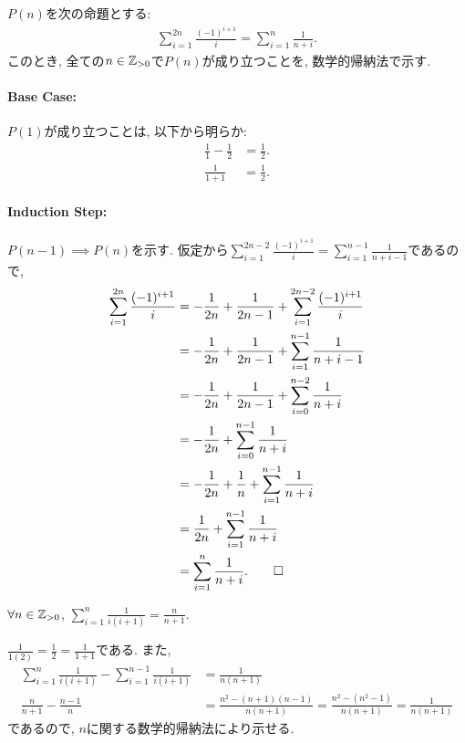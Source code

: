 \begin{proof*}
  $P(n)$を次の命題とする:
  \begin{align*}
    \sum_{i=1}^{2n}\frac{(-1)^{i+1}}{i}=\sum_{i=1}^n\frac{1}{n+i}.
  \end{align*}
  このとき,
  全ての$n\in\mathbb{Z}_{>0}$で$P(n)$が成り立つことを,
  数学的帰納法で示す.

  \paragraph{Base Case:}
  $P(1)$が成り立つことは, 以下から明らか:
  \begin{align*}
    \frac{1}{1}-\frac{1}{2}&=\frac{1}{2}.\\
    \frac{1}{1+1}&=\frac{1}{2}.
  \end{align*}

  \paragraph{Induction Step:}
  $P(n-1)\implies P(n)$を示す.
  仮定から$\sum_{i=1}^{2n-2}\frac{(-1)^{i+1}}{i}=\sum_{i=1}^{n-1}\frac{1}{n+i-1}$であるので,
  \begin{align*}
    \sum_{i=1}^{2n}\frac{(-1)^{i+1}}{i}
    &=-\frac{1}{2n}+\frac{1}{2n-1}+\sum_{i=1}^{2n-2}\frac{(-1)^{i+1}}{i}\\
    &=-\frac{1}{2n}+\frac{1}{2n-1}+\sum_{i=1}^{n-1}\frac{1}{n+i-1}\\
    &=-\frac{1}{2n}+\frac{1}{2n-1}+\sum_{i=0}^{n-2}\frac{1}{n+i}\\
    &=-\frac{1}{2n}+\sum_{i=0}^{n-1}\frac{1}{n+i}\\
    &=-\frac{1}{2n}+\frac{1}{n}+\sum_{i=1}^{n-1}\frac{1}{n+i}\\
    &=\frac{1}{2n}+\sum_{i=1}^{n-1}\frac{1}{n+i}\\
    &=\sum_{i=1}^{n}\frac{1}{n+i}
    .\qedhere
  \end{align*}
\end{proof*}

\begin{prop}
  \label{p:20230727}
  $\forall n \in \mathbb{Z}_{>0}$,
  $\sum_{i=1}^n\frac{1}{i(i+1)}=\frac{n}{n+1}$.
\end{prop}
\begin{proof**}
  $\frac{1}{1(2)}=\frac{1}{2}=\frac{1}{1+1}$である.
  また,
  \begin{align*}
    \sum_{i=1}^n\frac{1}{i(i+1)}-\sum_{i=1}^{n-1}\frac{1}{i(i+1)}
    &=\frac{1}{n(n+1)}\\
    \frac{n}{n+1}-\frac{n-1}{n}
    &=\frac{n^2-(n+1)(n-1)}{n(n+1)}
    =\frac{n^2-(n^2-1)}{n(n+1)}
    =\frac{1}{n(n+1)}
  \end{align*}
  であるので,
  $n$に関する数学的帰納法により示せる.
\end{proof**}

